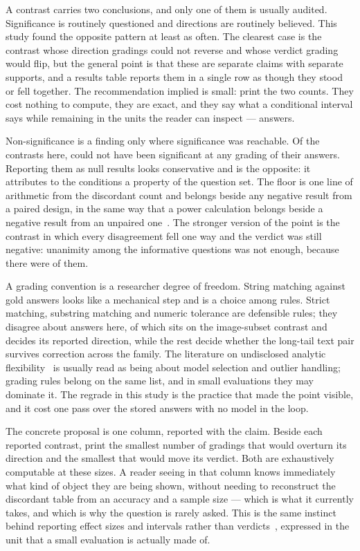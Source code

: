 A contrast carries two conclusions, and only one of them is usually audited.
Significance is routinely questioned and directions are routinely believed. This
study found the opposite pattern at least as often. The clearest case is the
contrast whose direction \HelpK{} gradings could not reverse and whose verdict
\HelpVerdictK{} grading would flip, but the general point is that these are
separate claims with separate supports, and a results table reports them in a
single row as though they stood or fell together. The recommendation implied is
small: print the two counts. They cost nothing to compute, they are exact, and
they say what a conditional interval says while remaining in the units the
reader can inspect --- answers.

Non-significance is a finding only where significance was reachable. Of the
\Contrasts{} contrasts here, \Incapable{} could not have been significant at
any grading of their answers. Reporting them as null results looks conservative
and is the opposite: it attributes to the conditions a property of the question
set. The floor is one line of arithmetic from the discordant count and belongs
beside any negative result from a paired design, in the same way that a power
calculation belongs beside a negative result from an unpaired
one~\cite{card2020little,amrhein2019scientists}. The stronger version of the
point is the contrast in which every disagreement fell one way and the verdict
was still negative: unanimity among the informative questions was not enough,
because there were \AtFloorNSDiscordant{} of them.

A grading convention is a researcher degree of freedom. String matching against
gold answers looks like a mechanical step and is a choice among rules. Strict
matching, substring matching and numeric tolerance are \Graders{} defensible
rules; they disagree about \RegradeContested{} answers here,
\RegradeImageFlip{} of which sits on the image-subset contrast and decides its
reported direction, while the rest decide whether the long-tail text pair
survives correction across the family. The literature on undisclosed analytic
flexibility~\cite{simmons2011false,gelman2014statistical} is usually read as
being about model selection and outlier handling; grading rules belong on the
same list, and in small evaluations they may dominate it. The regrade in this
study is the practice that made the point visible, and it cost one pass over the
stored answers with no model in the loop.

The concrete proposal is one column, reported with the claim. Beside each
reported contrast, print the smallest number of gradings that would overturn
its direction and the smallest that would move its verdict. Both are
exhaustively computable at these sizes. A reader seeing \HarmK{} in that column
knows immediately what kind of object they are being shown, without needing to
reconstruct the discordant table from an accuracy and a sample size --- which is
what it currently takes, and which is why the question is rarely asked. This is
the same instinct behind reporting effect sizes and intervals rather than
verdicts~\cite{wasserstein2016asa,amrhein2019scientists}, expressed in the unit
that a small evaluation is actually made of.

